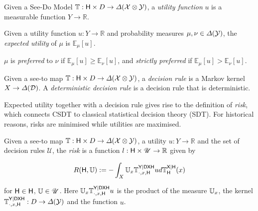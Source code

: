 \begin{definition}
Given a See-Do Model $\mathbb{T}:\mathsf{H}\times D\to \Delta(\mathcal{X}\otimes\mathcal{Y})$, a \emph{utility function} $u$ is a measurable function $Y\to \mathbb{R}$. 
\end{definition}

\begin{definition}
Given a utility function $u:Y\to \mathbb{R}$ and probability measures $\mu,\nu\in \Delta(\mathcal{Y})$, the \emph{expected utility} of $\mu$ is $\mathbb{E}_{\mu}[u]$.

$\mu$ is \emph{preferred} to $\nu$ if $\mathbb{E}_{\mu}[u]\geq \mathbb{E}_{\nu}[u]$, and \emph{strictly preferred} if $\mathbb{E}_{\mu}[u]>\mathbb{E}_{\nu}[u]$.
\end{definition}

\begin{definition}
Given a see-to map $\mathbb{T}:\mathsf{H}\times D\to \Delta(\mathcal{X}\otimes\mathcal{Y})$, a \emph{decision rule} is a Markov kernel $X\to \Delta(\mathcal{D})$. A \emph{deterministic decision rule} is a decision rule that is deterministic.

\end{definition}

Expected utility together with a decision rule gives rise to the definition of \emph{risk}, which connects CSDT to classical statistical decision theory (SDT). For historical reasons, risks are minimised while utilities are maximised.

\begin{definition}[Risk]
Given a see-to map $\mathbb{T}:\mathsf{H}\times D\to \Delta(\mathcal{X}\otimes\mathcal{Y})$, a utility $u:Y\to \mathbb{R}$ and the set of decision rules $\mathscr{U}$, the \emph{risk} is a function $l:\mathsf{H}\times \mathscr{U}\to \mathbb{R}$ given by

\begin{align}
    R(\mathsf{H},\mathbb{U}) := - \int_X  \mathbb{U}_x \mathbb{T}^{\mathsf{Y}|\mathsf{D}\mathsf{X}\mathsf{H}}_{\cdot,x,\mathsf{H}} u d\mathbb{T}^{\mathsf{X}|\mathsf{H}}_{\mathsf{H}}(x)
\end{align}

for $\mathsf{H}\in \mathsf{H}$, $\mathbb{U}\in \mathscr{U}$. Here $\mathbb{U}_x \mathbb{T}^{\mathsf{Y}|\mathsf{D}\mathsf{X}\mathsf{H}}_{\cdot,x,\mathsf{H}} u$ is the product of the measure $\mathbb{U}_x$, the kernel $\mathbb{T}^{\mathsf{Y}|\mathsf{D}\mathsf{X}\mathsf{H}}_{\cdot,x,\mathsf{H}}:D\to \Delta(\mathcal{Y})$ and the function $u$.
\end{definition}

